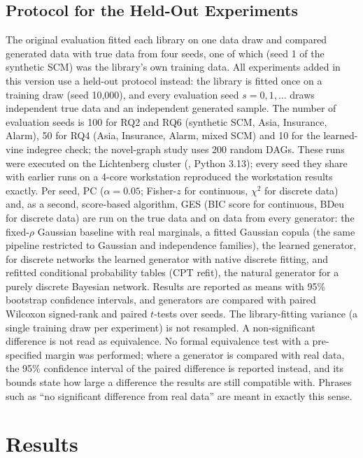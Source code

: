 \documentclass[
  english,
  class=report,
  accentcolor=2c,
  marginpar=false,
  parskip=half-,
  fontsize=11pt,
  ruledheaders=false,
  pdfa=false,
  IMRAD=false,
  thesis={type=master}
]{tudapub}
\begin{document}
\section{Protocol for the Held-Out Experiments}
\label{sec:reproduce-seeds}
The original evaluation fitted each library on one data draw and compared
generated data with true data from four seeds, one of which (seed 1 of the
synthetic SCM) was the library's own training data. All experiments added
in this version use a held-out protocol instead: the library is fitted once
on a training draw (seed 10{,}000), and every evaluation seed $s = 0, 1,
\dots$ draws independent true data and an independent generated sample.
The number of evaluation seeds is 100 for RQ2 and RQ6 (synthetic SCM,
Asia, Insurance, Alarm), 50 for RQ4 (Asia, Insurance, Alarm, mixed SCM) and
10 for the learned-vine indegree check; the novel-graph study uses 200
random DAGs. These runs were executed on the Lichtenberg cluster
(, Python 3.13); every seed they share with earlier runs on a
4-core workstation reproduced the workstation results exactly. Per seed,
PC ($\alpha = 0.05$; Fisher-$z$ for continuous, $\chi^2$ for discrete
data) and, as a second, score-based algorithm, GES (BIC score for
continuous, BDeu for discrete data) are run on the true data and on data from
every generator: the fixed-$\rho$ Gaussian baseline with real marginals,
a fitted Gaussian copula (the same pipeline restricted to Gaussian and
independence families), the learned generator, for discrete networks the
learned generator with native discrete fitting, and refitted conditional
probability tables (CPT refit), the natural generator for a purely discrete
Bayesian network. Results are reported as means with 95\% bootstrap
confidence intervals, and generators are compared with paired Wilcoxon
signed-rank and paired $t$-tests over seeds. The library-fitting variance
(a single training draw per experiment) is not resampled.
A non-significant difference is not read as equivalence. No formal
equivalence test with a pre-specified margin was performed; where a
generator is compared with real data, the 95\% confidence interval of the
paired difference is reported instead, and its bounds state how large a
difference the results are still compatible with. Phrases such as ``no
significant difference from real data'' are meant in exactly this sense.

\chapter{Results}
\label{chap:results}
\end{document}
